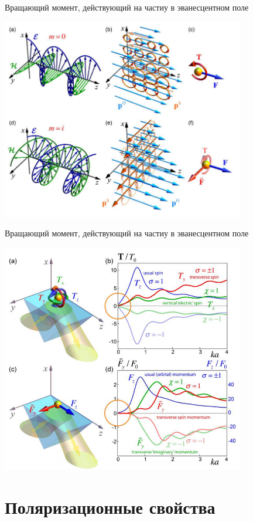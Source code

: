 \documentclass[9pt, compress, xcolor=table]{beamer}
\begin{document}
\begin{frame}{Вращающий момент, действующий на частиу в эванесцентном поле}
\begin{center}
\includegraphics[width=0.8\textwidth]{bliokh6}
\end{center}
\end{frame}

\begin{frame}{Вращающий момент, действующий на частиу в эванесцентном поле}
\begin{center}
\includegraphics[width=0.8\textwidth]{bliokh7}
\end{center}
\end{frame}
\section{Поляризационные свойства} 
\end{document}
